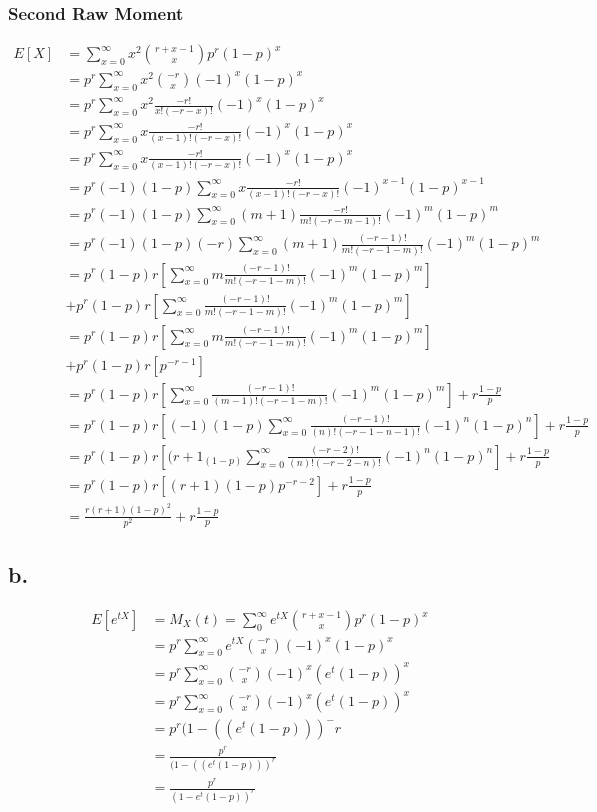 \documentclass[12pt]{article}
\begin{document}
\subsubsection*{Second Raw Moment}
\begin{align*}
  E[X] &= \sum_{x=0}^\infty x^2\binom{r+x-1}{x}p^r (1-p)^x \\
  &= p^r \sum_{x=0}^\infty x^2\binom{-r}{x}(-1)^x(1-p)^x \\
  &= p^r \sum_{x=0}^\infty x^2\frac{-r!}{x!(-r-x)!}(-1)^x(1-p)^x \\
  &= p^r \sum_{x=0}^\infty x\frac{-r!}{(x-1)!(-r-x)!}(-1)^x(1-p)^x \\
  &= p^r \sum_{x=0}^\infty x\frac{-r!}{(x-1)!(-r-x)!}(-1)^x(1-p)^x \\
  &= p^r(-1)(1-p) \sum_{x=0}^\infty x\frac{-r!}{(x-1)!(-r-x)!}(-1)^{x-1}(1-p)^{x-1} \\
  &= p^r(-1)(1-p) \sum_{x=0}^\infty (m+1)\frac{-r!}{m!(-r-m-1)!}(-1)^{m}(1-p)^{m} \\
  &= p^r(-1)(1-p)(-r) \sum_{x=0}^\infty (m+1)\frac{(-r-1)!}{m!(-r-1-m)!}(-1)^{m}(1-p)^{m} \\
  &= p^r(1-p)r \left[\sum_{x=0}^\infty m\frac{(-r-1)!}{m!(-r-1-m)!}(-1)^{m}(1-p)^{m}\right] \\
  &+ p^r(1-p)r \left[\sum_{x=0}^\infty \frac{(-r-1)!}{m!(-r-1-m)!}(-1)^{m}(1-p)^{m}\right]\\
  &= p^r(1-p)r \left[\sum_{x=0}^\infty m\frac{(-r-1)!}{m!(-r-1-m)!}(-1)^{m}(1-p)^{m}\right] \\
  &+ p^r(1-p)r \left[p^{-r-1}\right]\\
  &= p^r(1-p)r \left[\sum_{x=0}^\infty \frac{(-r-1)!}{(m-1)!(-r-1-m)!}(-1)^{m}(1-p)^{m}\right] 
  + r\frac{1-p}{p} \\
  &= p^r(1-p)r \left[(-1)(1-p)\sum_{x=0}^\infty \frac{(-r-1)!}{(n)!(-r-1-n-1)!}(-1)^{n}(1-p)^{n}\right] 
  + r\frac{1-p}{p} \\
  &= p^r(1-p)r \left[(r+1_(1-p)\sum_{x=0}^\infty \frac{(-r-2)!}{(n)!(-r-2-n)!}(-1)^{n}(1-p)^{n}\right] 
  + r\frac{1-p}{p} \\
  &= p^r(1-p)r \left[(r+1)(1-p)p^{-r-2}\right] + r\frac{1-p}{p} \\
  &= \frac{r(r+1)(1-p)^2}{p^2} + r\frac{1-p}{p}
\end{align*}

\subsection*{b.}
\begin{align*}
  E[e^{tX}] &= M_X(t) = \sum_0^\infty e^{tX} \binom{r+x-1}{x}p^r(1-p)^x \\
  &= p^r \sum_{x=0}^\infty e^{tX}\binom{-r}{x}(-1)^x(1-p)^x \\
  &= p^r \sum_{x=0}^\infty \binom{-r}{x}(-1)^x(e^{t}(1-p))^x \\
  &= p^r \sum_{x=0}^\infty \binom{-r}{x}(-1)^x(e^{t}(1-p))^x \\
  &= p^r (1-((e^{t}(1-p)))^-r \\
  &= \frac{p^r}{(1-((e^{t}(1-p)))^r} \\
  &= \frac{p^r}{(1-e^{t}(1-p))^r} \\
\end{align*}
\end{document}
